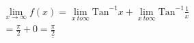\documentclass[dvipdfmx]{article}
\begin{document}
\section{}
  \subsection{}
    \begin{align*}
      \lim_{x \to \infty} f(x) = \lim_{x \ to \infty} \mathrm{Tan}^{-1} x + \lim_{x \ to \infty} \mathrm{Tan}^{-1} \frac{1}{x}\\
      = \frac{\pi}{2} + 0 = \underline{\frac{\pi}{2}}
    \end{align*}
\end{document}
